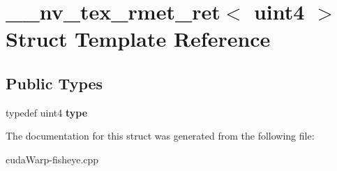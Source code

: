 \hypertarget{struct____nv__tex__rmet__ret_3_01uint4_01_4}{}\section{\+\_\+\+\_\+nv\+\_\+tex\+\_\+rmet\+\_\+ret$<$ uint4 $>$ Struct Template Reference}
\label{struct____nv__tex__rmet__ret_3_01uint4_01_4}
\subsection*{Public Types}
\begin{DoxyCompactItemize}
\item 
typedef uint4 {\bfseries type}\hypertarget{struct____nv__tex__rmet__ret_3_01uint4_01_4_a27318eb7febf9d00d45edd2d8c983654}{}\label{struct____nv__tex__rmet__ret_3_01uint4_01_4_a27318eb7febf9d00d45edd2d8c983654}

\end{DoxyCompactItemize}


The documentation for this struct was generated from the following file\+:\begin{DoxyCompactItemize}
\item 
cuda\+Warp-\/fisheye.\+cpp\end{DoxyCompactItemize}
